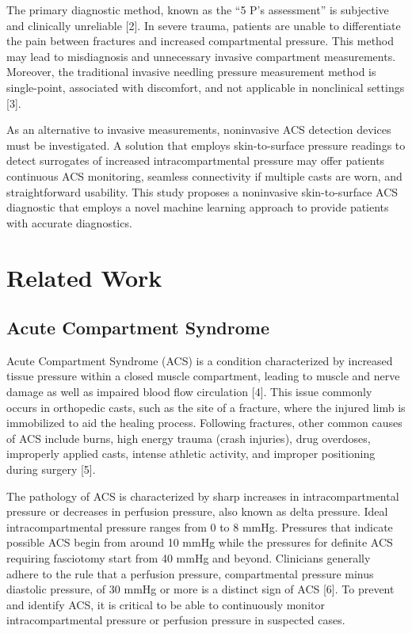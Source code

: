\documentclass{article}
\begin{document}
The primary diagnostic method, known as the “5 P’s assessment” is subjective and clinically unreliable [2]. In severe trauma, patients are unable to differentiate the pain between fractures and increased compartmental pressure. This method may lead to misdiagnosis and unnecessary invasive compartment measurements. Moreover, the traditional invasive needling pressure measurement method is single-point, associated with discomfort, and not applicable in nonclinical settings [3].

As an alternative to invasive measurements, noninvasive ACS detection devices must be investigated. A solution that employs skin-to-surface pressure readings to detect surrogates of increased intracompartmental pressure may offer patients continuous ACS monitoring, seamless connectivity if multiple casts are worn, and straightforward usability. This study proposes a noninvasive skin-to-surface ACS diagnostic that employs a novel machine learning approach to provide patients with accurate diagnostics.


\section{Related Work}
\subsection{Acute Compartment Syndrome}
Acute Compartment Syndrome (ACS) is a condition characterized by increased tissue pressure within a closed muscle compartment, leading to muscle and nerve damage as well as impaired blood flow circulation [4]. This issue commonly occurs in orthopedic casts, such as the site of a fracture, where the injured limb is immobilized to aid the healing process. Following fractures, other common causes of ACS include burns, high energy trauma (crash injuries), drug overdoses, improperly applied casts, intense athletic activity, and improper positioning during surgery [5]. 

The pathology of ACS is characterized by sharp increases in intracompartmental pressure or decreases in perfusion pressure, also known as delta pressure. Ideal intracompartmental pressure ranges from 0 to 8 mmHg. Pressures that indicate possible ACS begin from around 10 mmHg while the pressures for definite ACS requiring fasciotomy start from 40 mmHg and beyond. Clinicians generally adhere to the rule that a perfusion pressure, compartmental pressure minus diastolic pressure, of 30 mmHg or more is a distinct sign of ACS [6]. To prevent and identify ACS, it is critical to be able to continuously monitor intracompartmental pressure or perfusion pressure in suspected cases.
\end{document}
